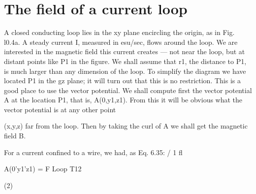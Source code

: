 \section{The field of a current loop}

A closed conducting loop lies in the xy plane encircling the origin,
as in Fig. l0.4a. A steady current I, measured in esu/sec, flows
around the loop. We are interested in the magnetic field this current
creates --- not near the loop, but at distant points like P1 in the figure.
We shall assume that r1, the distance to P1, is much larger than any
dimension of the loop. To simplify the diagram we have located P1
in the gz plane; it will turn out that this is no restriction. This is a
good place to use the vector potential. We shall compute first the
vector potential A at the location P1, that is, A(0,y1,z1). From this
it will be obvious what the vector potential is at any other point

(x,y,z) far from the loop. Then by taking the curl of A we shall get
the magnetic field B.

For a current confined to a wire, we had, as Eq. 6.35:
/
1 fl

A(0'y1'z1) = F Loop T12

(2)

